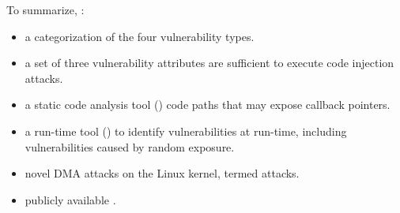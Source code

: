 To summarize, \DIFdelbegin {}\DIFdelend \DIFaddbegin {}\DIFaddend :
\begin{itemize}
    \item \DIFdelbegin {}\DIFdelend \DIFaddbegin {}\DIFaddend a categorization of the four \subpage{} vulnerability types.
    \item \DIFdelbegin {}\DIFdelend \DIFaddbegin {}\DIFaddend a set of three vulnerability attributes \DIFdelbegin {}\DIFdelend \DIFaddbegin {}\DIFaddend are sufficient to execute code injection attacks.
    \item \DIFdelbegin {}\DIFdelend \DIFaddbegin {}\DIFaddend a static code analysis tool (\tool) \DIFdelbegin {}\DIFdelend \DIFaddbegin {}\DIFaddend code paths that may expose callback pointers. 
    \item \DIFdelbegin {}\DIFdelend \DIFaddbegin {}\DIFaddend a run-time tool (\dkasan) to identify \subpage{} vulnerabilities at run-time, including vulnerabilities caused by random exposure.
    \item \DIFdelbegin {}\DIFdelend \DIFaddbegin {}\DIFaddend novel DMA attacks on the Linux kernel, termed \compound{} attacks.
    \item \DIFdelbegin {}\DIFdelend \DIFaddbegin {}\DIFaddend publicly available \cite{DKASAN,SPADE}.
\end{itemize}



